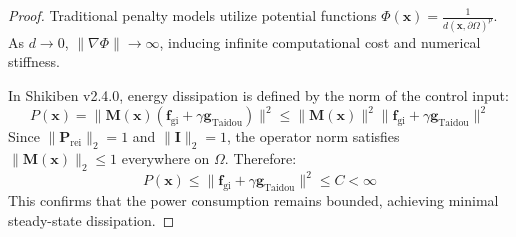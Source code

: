 \documentclass[11pt,a4paper]{article}
\begin{document}
\begin{proof}
Traditional penalty models utilize potential functions $\Phi(\mathbf{x}) = \frac{1}{d(\mathbf{x}, \partial\Omega)^p}$. As $d \to 0$, $\|\nabla \Phi\| \to \infty$, inducing infinite computational cost and numerical stiffness.

In Shikiben v2.4.0, energy dissipation is defined by the norm of the control input:
\begin{equation}
P(\mathbf{x}) = \|\mathbf{M}(\mathbf{x})(\mathbf{f}_{\text{gi}} + \gamma \mathbf{g}_{\text{Taidou}})\|^2 \le \|\mathbf{M}(\mathbf{x})\|^2 \|\mathbf{f}_{\text{gi}} + \gamma \mathbf{g}_{\text{Taidou}}\|^2
\end{equation}
Since $\|\mathbf{P}_{\text{rei}}\|_2 = 1$ and $\|\mathbf{I}\|_2 = 1$, the operator norm satisfies $\|\mathbf{M}(\mathbf{x})\|_2 \le 1$ everywhere on $\Omega$. Therefore:
\begin{equation}
P(\mathbf{x}) \le \|\mathbf{f}_{\text{gi}} + \gamma \mathbf{g}_{\text{Taidou}}\|^2 \le C < \infty
\end{equation}
This confirms that the power consumption remains bounded, achieving minimal steady-state dissipation.
\end{proof}
\end{document}
